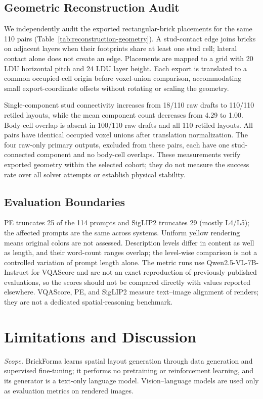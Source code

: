 \documentclass[letterpaper]{article} %
\begin{document}
\subsection{Geometric Reconstruction Audit}

We independently audit the exported rectangular-brick placements for the same 110 pairs (Table~\ref{tab:reconstruction-geometry}). A stud-contact edge joins bricks on adjacent layers when their footprints share at least one stud cell; lateral contact alone does not create an edge. Placements are mapped to a grid with 20 LDU horizontal pitch and 24 LDU layer height. Each export is translated to a common occupied-cell origin before voxel-union comparison, accommodating small export-coordinate offsets without rotating or scaling the geometry.

Single-component stud connectivity increases from 18/110 raw drafts to 110/110 retiled layouts, while the mean component count decreases from 4.29 to 1.00. Body-cell overlap is absent in 100/110 raw drafts and all 110 retiled layouts. All pairs have identical occupied voxel unions after translation normalization. The four raw-only primary outputs, excluded from these pairs, each have one stud-connected component and no body-cell overlaps. These measurements verify exported geometry within the selected cohort; they do not measure the success rate over all solver attempts or establish physical stability.

\subsection{Evaluation Boundaries}
PE truncates 25 of the 114 prompts and SigLIP2 truncates 29 (mostly L4/L5); the affected prompts are the same across systems. Uniform yellow rendering means original colors are not assessed. Description levels differ in content as well as length, and their word-count ranges overlap; the level-wise comparison is not a controlled variation of prompt length alone. The metric runs use Qwen2.5-VL-7B-Instruct for VQAScore and are not an exact reproduction of previously published evaluations, so the scores should not be compared directly with values reported elsewhere. VQAScore, PE, and SigLIP2 measure text--image alignment of renders; they are not a dedicated spatial-reasoning benchmark.

\section{Limitations and Discussion}
\label{sec:limitations}
\emph{Scope.} BrickForma learns spatial layout generation through data generation and supervised fine-tuning; it performs no pretraining or reinforcement learning, and its generator is a text-only language model. Vision--language models are used only as evaluation metrics on rendered images.
\end{document}
